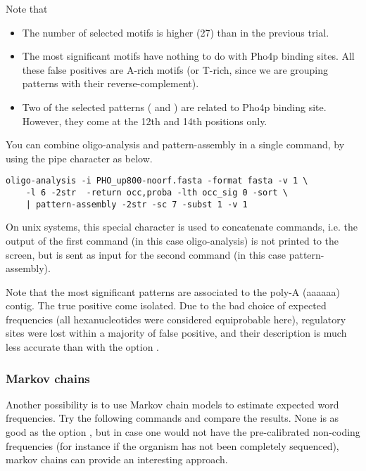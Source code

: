 Note that
\begin{itemize} 
\item The number of selected motifs is higher (27) than in the
  previous trial.
\item The most significant motifs have nothing to do with Pho4p
  binding sites. All these false positives are A-rich motifs (or
  T-rich, since we are grouping patterns with their
  reverse-complement).
\item Two of the selected patterns ( and ) are
  related to Pho4p binding site. However, they come at the 12th and
  14th positions only.
\end{itemize}

You can combine oligo-analysis and pattern-assembly in a single
command, by using the pipe character as below.

{\color{Blue} \begin{footnotesize} 
\begin{verbatim}
oligo-analysis -i PHO_up800-noorf.fasta -format fasta -v 1 \
    -l 6 -2str  -return occ,proba -lth occ_sig 0 -sort \
    | pattern-assembly -2str -sc 7 -subst 1 -v 1 
\end{verbatim} \end{footnotesize}
}


On unix systems, this special character is used to concatenate
commands, i.e. the output of the first command (in this case
oligo-analysis) is not printed to the screen, but is sent as input for
the second command (in this case pattern-assembly).

Note that the most significant patterns are associated to the poly-A
(aaaaaa) contig. The true positive come isolated. Due to the bad
choice of expected frequencies (all hexanucleotides were considered
equiprobable here), regulatory sites were lost within a majority of
false positive, and their description is much less accurate than with
the option \option{-bg upstream}.

\subsubsection{Markov chains}

Another possibility is to use Markov chain models to estimate expected
word frequencies. Try the following commands and compare the
results. None is as good as the option \option{-bg upstream},
but in case one would not have the pre-calibrated non-coding
frequencies (for instance if the organism has not been completely
sequenced), markov chains can provide an interesting approach.

